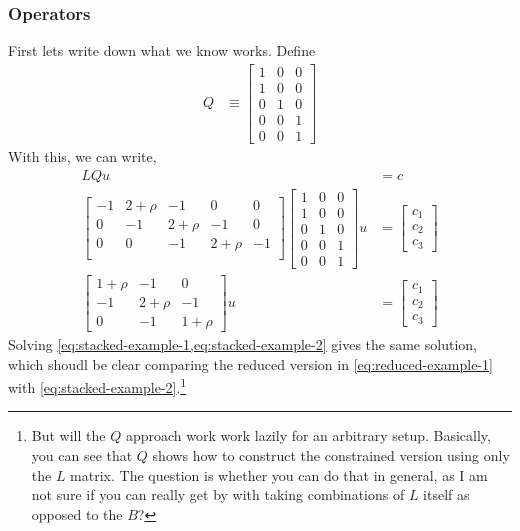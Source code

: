 \documentclass[11pt]{article}
\begin{document}
\subsubsection{Operators}
First lets write down what we know works.  Define
\begin{align}
Q &\equiv \begin{bmatrix}
1 & 0 & 0\\
1 & 0 & 0\\
0 & 1& 0\\
0 & 0& 1\\
0 & 0& 1
\end{bmatrix}
\end{align}\label{eq:Q-example}
With this, we can write,
\begin{align}
L Q u &= c\\
\begin{bmatrix}
-1 & 2 + \rho & -1 & 0 & 0\\
0 & -1 & 2+\rho & -1 & 0\\
0 & 0 & -1 & 2+\rho & -1\\
\end{bmatrix}\begin{bmatrix}
1 & 0 & 0\\
1 & 0 & 0\\
0 & 1& 0\\
0 & 0& 1\\
0 & 0& 1
\end{bmatrix} u &= \begin{bmatrix} c_1 \\ c_2 \\ c_3\end{bmatrix}\\
\begin{bmatrix}
1 + \rho & -1 & 0\\
-1 & 2+\rho & -1\\
0 & -1 & 1+\rho
\end{bmatrix} u &= \begin{bmatrix} c_1 \\ c_2 \\ c_3\end{bmatrix}\label{eq:stacked-example-2}
\end{align}
Solving \cref{eq:stacked-example-1,eq:stacked-example-2} gives the same solution, which shoudl be clear comparing the reduced version in \cref{eq:reduced-example-1} with \cref{eq:stacked-example-2}.\footnote{But will the $Q$ approach work work lazily for an arbitrary setup.  Basically, you can see that $Q$ shows how to construct the constrained version using only the $L$ matrix.  The question is whether you can do that in general, as I am not sure if you can really get by with taking combinations of $L$ itself as opposed to the $B$?}
\end{document}
